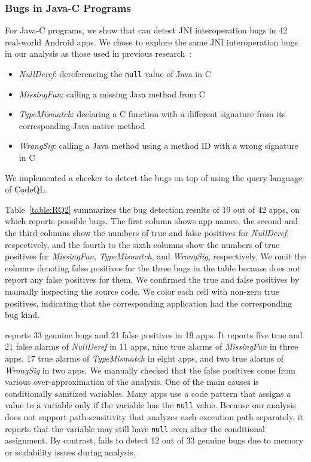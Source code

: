 \subsubsection{Bugs in Java-C Programs}
For Java-C programs, we show that \ours can detect JNI interoperation bugs in
42 real-world Android apps.  We chose to explore the same JNI interoperation
bugs in our analysis as those used in previous research~\cite{LeeASE20, ILEA}:
\begin{itemize}
  \item {\it NullDeref}: dereferencing the {\tt null} value of Java in C
  \item {\it MissingFun}: calling a missing Java method from C
  \item {\it TypeMismatch}: declaring a C function with a different signature
    from its corresponding Java native method
  \item {\it WrongSig}: calling a Java method using a method ID with a
    wrong signature in C
\end{itemize}
We implemented a checker to detect the bugs on top of \ours using the query
language of CodeQL.

Table~\ref{table:RQ2} summarizes the bug detection results of 19 out of 42
apps, on which \ours reports possible bugs.  The first column shows app names,
the second and the third columns show the numbers of true and false positives
for {\it NullDeref}, respectively, and the fourth to the sixth columns show the
numbers of true positives for {\it MissingFun}, {\it TypeMismatch}, and {\it
WrongSig}, respectively.  We omit the columns denoting false positives for the
three bugs in the table because \ours does not report any false positives for
them.  We confirmed the true and false positives by manually inspecting the
source code.  We color each cell with non-zero true positives, indicating that
the corresponding application had the corresponding bug kind.

\ours reports 33 genuine bugs and 21 false positives in 19 apps.  It reports
five true and 21 false alarms of {\it NullDeref} in 11 apps, nine true alarms
of {\it MissingFun} in three apps, 17 true alarms of {\it TypeMismatch} in
eight apps, and two true alarms of {\it WrongSig} in two apps.  We manually
checked that the false positives come from various over-approximation of the
analysis. One of the main causes is conditionally sanitized variables.  Many
apps use a code pattern that assigns a value to a variable only if the variable
has the {\tt null} value. Because our analysis does not support
path-sensitivity that analyzes each execution path separately, it reports that
the variable may still have {\tt null} even after the conditional assignment.
By contrast, \lees fails to detect 12 out of 33 genuine bugs due to memory or
scalability issues during analysis.

